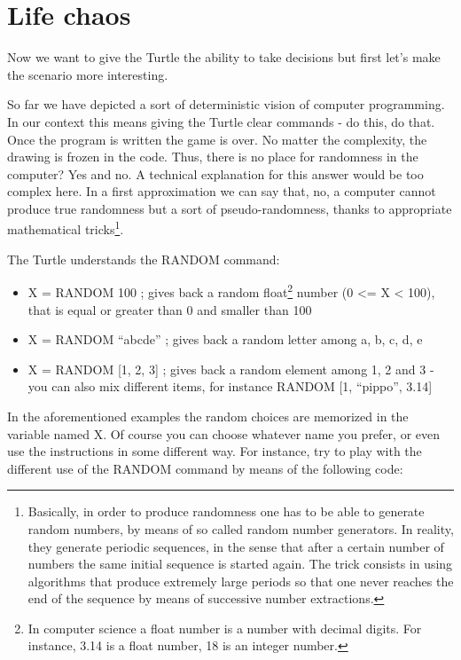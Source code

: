\chapter{Life chaos} \label{cap:caos-della-vita}

Now we want to give the Turtle the ability to take decisions but first let's make the scenario more interesting. 

So far we have depicted a sort of deterministic vision of computer programming. In our context this means giving the Turtle clear commands - do this, do that. Once the program is written the game is over. No matter the complexity, the drawing is frozen in the code. Thus, there is no place for randomness in the computer? Yes and no. A technical explanation for this answer would be too complex here. In a first approximation we can say that, no, a computer cannot produce true randomness but a sort of pseudo-randomness, thanks to appropriate mathematical tricks\footnote{Basically, in order to produce randomness one has to be able to generate random numbers, by means of so called random number generators. In reality, they generate periodic sequences, in the sense that after a certain number of numbers the same initial sequence is started again. The trick consists in using algorithms that produce extremely large periods so that one never reaches the end of the sequence by means of successive number extractions.}.

The Turtle understands the RANDOM command:

\begin{itemize}
\item X = RANDOM 100 ; gives back a random float\footnote{In computer science a float number is a number with decimal digits. For instance, 3.14 is a float number, 18 is an integer number.} number (0 <= X < 100), that is equal or greater than 0 and smaller than 100
\item X = RANDOM “abcde” ; gives back a random letter among a, b, c, d, e
\item X = RANDOM [1, 2, 3] ; gives back a random element among 1, 2 and 3 - you can also mix different items, for instance RANDOM [1, “pippo”, 3.14]
\end{itemize}

In the aforementioned examples the random choices are memorized in the variable named X. Of course you can choose whatever name you prefer, or even use the instructions in some different way. For instance, try to play with the different use of the RANDOM command by means of the following code:

